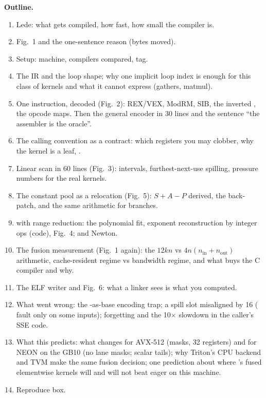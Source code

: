 \begin{blogbox}
\textbf{Outline.}
\begin{enumerate}
  \item Lede: what gets compiled, how fast, how small the compiler is.
  \item Fig.~1 and the one-sentence reason (bytes moved).
  \item Setup: machine, compilers compared, tag.
  \item The IR and the loop shape; why one implicit loop index is enough for this class of kernels and what it cannot express (gathers, matmul).
  \item One instruction, decoded (Fig.~2): REX/VEX, ModRM, SIB, the inverted , the opcode maps. Then the general encoder in 30 lines and the sentence ``the assembler is the oracle''.
  \item The calling convention as a contract: which registers you may clobber, why the kernel is a leaf, .
  \item Linear scan in 60 lines (Fig.~3): intervals, furthest-next-use spilling, pressure numbers for the real kernels.
  \item The constant pool as a relocation (Fig.~5): $S + A - P$ derived, the back-patch, and the same arithmetic for branches.
  \item {} with range reduction: the polynomial fit, exponent reconstruction by integer ops (code), Fig.~4;  and Newton.
  \item The fusion measurement (Fig.~1 again): the $12kn$ vs $4n(n_{\text{in}}+n_{\text{out}})$ arithmetic, cache-resident regime vs bandwidth regime, and what  buys the C compiler and why.
  \item The ELF writer and Fig.~6: what a linker sees is what you computed.
  \item What went wrong: the -as-base encoding trap; a spill slot misaligned by 16 ( fault only on some inputs); forgetting  and the 10$\times$ slowdown in the caller's SSE code.
  \item What this predicts: what changes for AVX-512 (masks, 32 registers) and for NEON on the GB10 (no lane masks; scalar tails); why Triton's CPU backend and TVM make the same fusion decision; one prediction about where 's fused elementwise kernels will and will not beat eager on this machine.
  \item Reproduce box.
\end{enumerate}


\end{blogbox}
